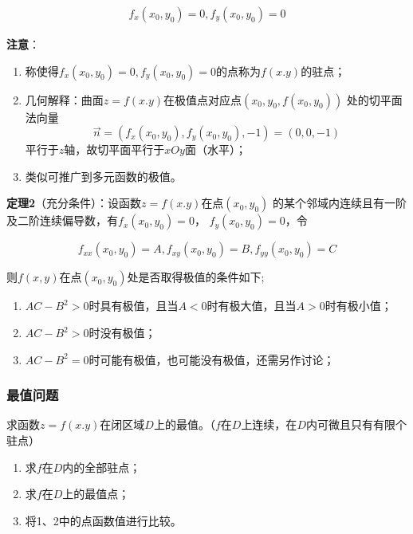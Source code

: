 \documentclass[12pt, a4paper]{article}
\numberwithin{equation}{section}
\begin{document}
    \begin{align}
        f_x\left(x_0,y_0\right) = 0, f_y\left(x_0,y_0\right) = 0
    \end{align}

    \textbf{注意}：

    \begin{enumerate}
        \item 称使得\(f_x\left(x_0,y_0\right) = 0, f_y\left(x_0,y_0\right) = 0\)的点称为\(f\left(x.y\right)\)的驻点；
        \item 几何解释：曲面\(z=f\left(x.y\right)\)在极值点对应点\(\left(x_0,y_0,f\left(x_0,y_0\right)\right)\)
            处的切平面法向量
            $$
                \overrightarrow{n}=\left(f_x\left(x_0, y_0\right), f_y\left(x_0, y_0\right),-1\right)=(0,0,-1)
            $$
            平行于\(z\)轴，故切平面平行于\(xOy\)面（水平）；
        \item 类似可推广到多元函数的极值。
    \end{enumerate}

    \textbf{定理2}（充分条件）：设函数\(z=f\left(x.y\right)\)在点\(\left(x_0,y_0\right)\)
    的某个邻域内连续且有一阶及二阶连续偏导数，有\(f_x\left(x_0,y_0\right) = 0\)，
    \(f_y\left(x_0,y_0\right) = 0\)，令

    $$
        f_{x x}\left(x_0, y_0\right)=A, f_{x y}\left(x_0, y_0\right)=B, f_{y y}\left(x_0, y_0\right)=C
    $$

    则\(f\left(x,y\right)\)在点\(\left(x_0,y_0\right)\)处是否取得极值的条件如下;

    \begin{enumerate}
        \item \(AC - B^2>0\)时具有极值，且当\(A<0\)时有极大值，且当\(A>0\)时有极小值；
        \item \(AC - B^2>0\)时没有极值；
        \item \(AC - B^2=0\)时可能有极值，也可能没有极值，还需另作讨论；
    \end{enumerate}

\subsubsection{最值问题}

    求函数\(z=f\left(x.y\right)\)在闭区域\(D \)上的最值。（\(f \)在\(D \)上连续，在\(D \)内可微且只有有限个驻点）

    \begin{enumerate}
        \item 求\(f \)在\(D \)内的全部驻点；
        \item 求\(f \)在\(D \)上的最值点；
        \item 将1、2中的点函数值进行比较。
    \end{enumerate}
\end{document}
